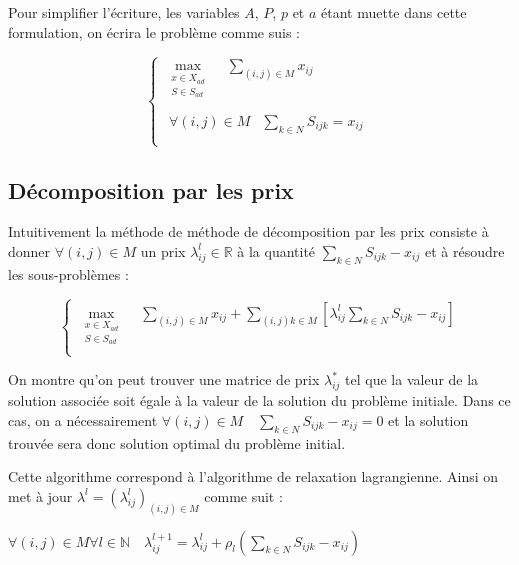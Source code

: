 \documentclass[a4paper,11pt] {article}
\begin{document}
Pour simplifier l'écriture, les variables $A$, $P$, $p$ et $a$ étant muette dans cette formulation, on écrira le problème comme suis : 

\begin{equation}
\left\{
\begin{array}{l}
\max\limits_{\substack{x\in X_{ad}\\S\in S_{ad}} }\quad\sum\limits_{(i,j)\in M} x_{ij}\\
\\
	\begin{array}{ll}
		\forall{(i,j)} \in M&\sum\limits_{k\in N} S_{ijk} = x_{ij}\\
		\end{array}
\end{array}
\right.
\end{equation}
\subsection{Décomposition par les prix}


Intuitivement la méthode de méthode de décomposition par les prix consiste à donner $\forall{(i,j)}\in M$ un prix $\lambda_{ij}^l\in \mathbb{R}$ à la quantité $\sum\limits_{k\in N} S_{ijk} - x_{ij}$ et à résoudre les sous-problèmes : 

\begin{equation}
\left\{
\begin{array}{l}
\max\limits_{\substack{x\in X_{ad}\\S\in S_{ad}} }\quad\sum\limits_{(i,j)\in M} x_{ij} + \sum\limits_{(i,j)k\in M}[\lambda_{ij}^l \sum\limits_{k\in N} S_{ijk} - x_{ij}]\\
\end{array}
\right.
\end{equation}

On montre qu'on peut trouver une matrice de prix $\lambda^*_{ij}$ tel que la valeur de la solution associée soit égale à la valeur de la solution du problème initiale. Dans ce cas, on a nécessairement $\forall (i,j) \in M \quad \sum\limits_{k\in N} S_{ijk} - x_{ij} = 0$ et la solution trouvée sera donc solution optimal du problème initial.

Cette algorithme correspond à l'algorithme de relaxation lagrangienne. Ainsi on met à jour $\lambda^l=(\lambda_{ij}^l)_{(i,j)\in M}$ comme suit : 

$\forall (i,j) \in M \forall l \in \mathbb{N}\quad
 \lambda_{ij}^{l+1} = \lambda_{ij}^{l}+\rho_l (\sum\limits_{k\in N} S_{ijk} - x_{ij})$
 
\end{document}
